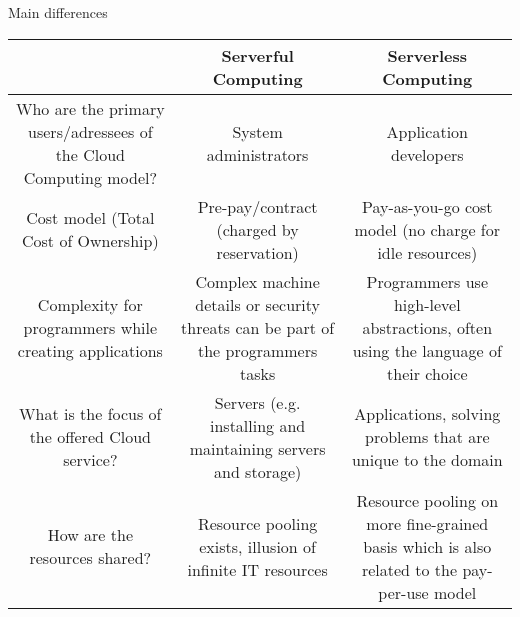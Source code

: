 \documentclass{article}
\begin{document}
Main differences\\
\begin{adjustbox}{width=1.7\textwidth,center=\textwidth}
    \begin{tabular}{ | c | c | c | }
                                                                          & Serverful Computing                                                              & Serverless Computing                                                                       \\
        \hline

        Who are the primary users/adressees of the Cloud Computing model? & System administrators                                                            & Application developers                                                                     \\
        \hline

        Cost model (Total Cost of Ownership)                              & Pre-pay/contract (charged by reservation)                                        & Pay-as-you-go cost model (no charge for idle resources)                                    \\
        \hline

        Complexity for programmers while creating applications            & Complex machine details or security threats can be part of the programmers tasks & Programmers use high-level abstractions, often using the language of their choice          \\
        \hline

        What is the focus of the offered Cloud service?                   & Servers (e.g. installing and maintaining servers and storage)                    & Applications, solving problems that are unique to the domain                               \\
        \hline

        How are the resources shared?                                     & Resource pooling exists, illusion of infinite IT resources                       & Resource pooling on more fine-grained basis which is also related to the pay-per-use model \\
        \hline
    \end{tabular}
\end{adjustbox}
\end{document}
